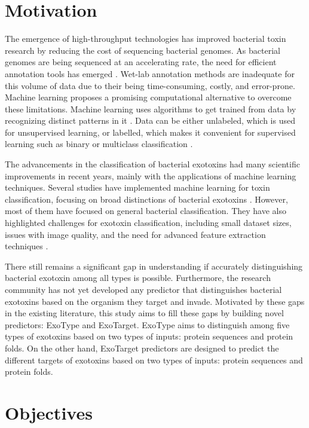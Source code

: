 \section{Motivation}
The emergence of high-throughput technologies has improved bacterial toxin research by reducing the cost of sequencing bacterial genomes.
As bacterial genomes are being sequenced at an accelerating rate, the need for efficient annotation tools has emerged \cite{loman2012high} \cite{richardson2013automatic}.
Wet-lab annotation methods are inadequate for this volume of data due to their being time-consuming, costly, and error-prone.
Machine learning proposes a promising computational alternative to overcome these limitations.
Machine learning uses algorithms to get trained from data by recognizing distinct patterns in it \cite{batta2020machine}. Data can be either unlabeled, which is used for unsupervised learning, or labelled, which makes it convenient for supervised learning such as binary or multiclass classification \cite{sarker2021machine} \cite{alnuaimi2021machinelearning}.

The advancements in the classification of bacterial exotoxins had many scientific improvements in recent years, mainly with the applications of machine learning techniques.
Several studies have implemented machine learning for toxin classification, focusing on broad distinctions of bacterial exotoxins \cite{saha2007btxpred} \cite{beltran2021multitoxpred}.
However, most of them have focused on general bacterial classification.
They have also highlighted challenges for exotoxin classification, including small dataset sizes, issues with image quality, and the need for advanced feature extraction techniques \cite{automated2021bacterial}.


There still remains a significant gap in understanding if accurately distinguishing bacterial exotoxin among all types is possible.
Furthermore, the research community has not yet developed any predictor that distinguishes bacterial exotoxins based on the organism they target and invade.
Motivated by these gaps in the existing literature, this study aims to fill these gaps by building novel predictors: ExoType and ExoTarget.
ExoType aims to distinguish among five types of exotoxins based on two types of inputs: protein sequences and protein folds.
On the other hand, ExoTarget predictors are designed to predict the different targets of exotoxins based on two types of inputs: protein sequences and protein folds.

\section{Objectives}

